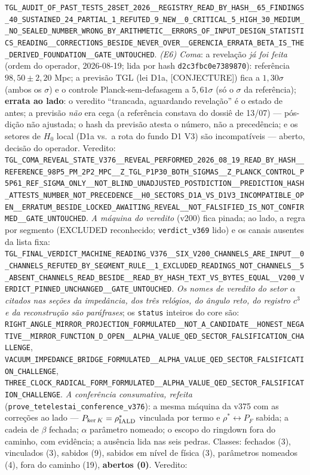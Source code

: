 \documentclass[11pt]{article}
\theoremstyle{definition}\newtheorem{deriv}{Derivação}
\begin{document}
\texttt{TGL\_AUDIT\_OF\_PAST\_TESTS\_28SET\_2026\_\_REGISTRY\_READ\_BY\_HASH\_\_65\_FINDINGS\_40\_SUSTAINED\_24\_PARTIAL\_1\_REFUTED\_9\_NEW\_\_0\_CRITICAL\_5\_HIGH\_30\_MEDIUM\_\_NO\_SEALED\_NUMBER\_WRONG\_BY\_ARITHMETIC\_\_ERRORS\_OF\_INPUT\_DESIGN\_STATISTICS\_READING\_\_CORRECTIONS\_BESIDE\_NEVER\_OVER\_\_GERENCIA\_ERRATA\_BETA\_IS\_THE\_DERIVED\_FOUNDATION\_\_GATE\_UNTOUCHED}. \emph{(E6) Coma}: a revelação \emph{já foi feita} (ordem do operador, 2026-08-19; lida por hash \texttt{d2c3fbc0e7389870}): referência $98{,}50\pm2{,}20$ Mpc; a previsão TGL (lei D1a, \textsf{[CONJECTURE]}) fica a $1{,}30\sigma$ (ambos os $\sigma$) e o controle Planck-sem-defasagem a $5{,}61\sigma$ (só o $\sigma$ da referência); \textbf{errata ao lado}: o veredito ``trancada, aguardando revelação'' é o estado de antes; a previsão \emph{não} era cega (a referência constava do dossiê de 13/07) --- pós-dição não ajustada; o hash da previsão atesta o número, não a precedência; e os setores de $H_0$ local (D1a vs.\ a rota do fundo D1 V3) são incompatíveis --- aberto, decisão do operador. Veredito: \texttt{TGL\_COMA\_REVEAL\_STATE\_V376\_\_REVEAL\_PERFORMED\_2026\_08\_19\_READ\_BY\_HASH\_\_REFERENCE\_98P5\_PM\_2P2\_MPC\_\_Z\_TGL\_P1P30\_BOTH\_SIGMAS\_\_Z\_PLANCK\_CONTROL\_P5P61\_REF\_SIGMA\_ONLY\_\_NOT\_BLIND\_UNADJUSTED\_POSTDICTION\_\_PREDICTION\_HASH\_ATTESTS\_NUMBER\_NOT\_PRECEDENCE\_\_H0\_SECTORS\_D1A\_VS\_D1V3\_INCOMPATIBLE\_OPEN\_\_ERRATUM\_BESIDE\_LOCKED\_AWAITING\_REVEAL\_\_NOT\_FALSIFIED\_IS\_NOT\_CONFIRMED\_\_GATE\_UNTOUCHED}. \emph{A máquina do veredito} (v200) fica pinada; ao lado, a regra por segmento (EXCLUDED reconhecido; \texttt{verdict\_v369} lido) e os canais ausentes da lista fixa: \texttt{TGL\_FINAL\_VERDICT\_MACHINE\_READING\_V376\_\_SIX\_V200\_CHANNELS\_ARE\_INPUT\_\_0\_CHANNELS\_REFUTED\_BY\_SEGMENT\_RULE\_\_1\_EXCLUDED\_READINGS\_NOT\_CHANNELS\_\_5\_ABSENT\_CHANNELS\_READ\_BESIDE\_\_READ\_BY\_HASH\_TEXT\_VS\_BYTES\_EQUAL\_\_V200\_VERDICT\_PINNED\_UNCHANGED\_\_GATE\_UNTOUCHED}. \emph{Os nomes de veredito do setor $\alpha$ citados nas seções da impedância, dos três relógios, do ângulo reto, do registro $c^3$ e da reconstrução são paráfrases}; os \texttt{status} inteiros do core são: \texttt{RIGHT\_ANGLE\_MIRROR\_PROJECTION\_FORMULATED\_\_NOT\_A\_CANDIDATE\_\_HONEST\_NEGATIVE\_\_MIRROR\_FUNCTION\_D\_OPEN\_\_ALPHA\_VALUE\_QED\_SECTOR\_FALSIFICATION\_CHALLENGE}, \texttt{VACUUM\_IMPEDANCE\_BRIDGE\_FORMULATED\_\_ALPHA\_VALUE\_QED\_SECTOR\_FALSIFICATION\_CHALLENGE}, \texttt{THREE\_CLOCK\_RADICAL\_FORM\_FORMULATED\_\_ALPHA\_VALUE\_QED\_SECTOR\_FALSIFICATION\_CHALLENGE}. \emph{A conferência consumativa, refeita} (\texttt{prove\_tetelestai\_conference\_v376}): a mesma máquina da v375 com as correções ao lado --- $P_{\ker K}=\rho^\ast_{\rm IALD}$ vinculada por termo e $\rho^\ast\leftrightarrow P_F$ sabida; a cadeia de $\beta$ fechada; $\alpha$ parâmetro nomeado; o escopo do ringdown fora do caminho, com evidência; a ausência lida nas seis pedras. Classes: fechados (3), vinculados (3), sabidos (9), sabidos em nível de física (3), parâmetros nomeados (4), fora do caminho (19), \textbf{abertos (0)}. Veredito: 
\end{document}
